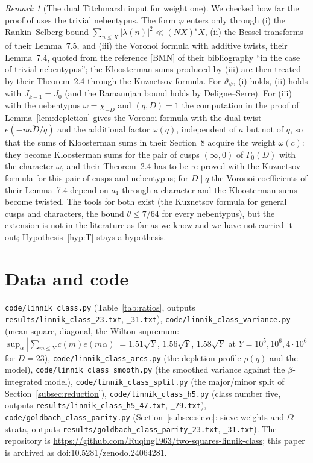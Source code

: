 \documentclass[11pt]{amsart}
\theoremstyle{remark}
\newtheorem{remark}[theorem]{Remark}
\newcommand{\vt}{\vartheta}
\newcommand{\e}{\varepsilon}
\begin{document}
\begin{remark}[The dual Titchmarsh input for weight one]\label{rem:ABL}
We checked how far the proof of \cite[Theorem~1.3]{ABL} uses the trivial nebentypus. The form $\varphi$ enters only through (i) the Rankin--Selberg bound $\sum_{n\le X}|\lambda(n)|^2\ll(NX)^\e X$, (ii) the Bessel transforms of their Lemma~7.5, and (iii) the Voronoi formula with additive twists, their Lemma~7.4, quoted from the reference [BMN] of their bibliography ``in the case of trivial nebentypus''; the Kloosterman sums produced by (iii) are then treated by their Theorem~2.4 through the Kuznetsov formula. For $\vt_\psi$, (i) holds, (ii) holds with $J_{k-1}=J_0$ (and the Ramanujan bound holds by Deligne--Serre). For (iii) with the nebentypus $\omega=\chi_{-D}$ and $(q,D)=1$ the computation in the proof of Lemma~\ref{lem:depletion} gives the Voronoi formula with the dual twist $e(-n\overline{aD}/q)$ and the additional factor $\omega(q)$, independent of $a$ but not of $q$, so that the sums of Kloosterman sums in their Section~8 acquire the weight $\omega(c)$: they become Kloosterman sums for the pair of cusps $(\infty,0)$ of $\Gamma_0(D)$ with the character $\omega$, and their Theorem~2.4 has to be re-proved with the Kuznetsov formula for this pair of cusps and nebentypus; for $D\mid q$ the Voronoi coefficients of their Lemma~7.4 depend on $a_1$ through a character and the Kloosterman sums become twisted. The tools for both exist (the Kuznetsov formula for general cusps and characters, the bound $\theta\le7/64$ for every nebentypus), but the extension is not in the literature as far as we know and we have not carried it out; Hypothesis~\ref{hyp:T} stays a hypothesis.
\end{remark}

\section*{Data and code}
{\raggedright \texttt{code/linnik\_class.py} (Table~\ref{tab:ratios}, outputs \texttt{results/linnik\_class\_23.txt}, \texttt{\_31.txt}), \texttt{code/linnik\_class\_variance.py} (mean square, diagonal, the Wilton supremum: $\sup_\alpha|\sum_{m\le Y}c(m)e(m\alpha)|=1.51\sqrt Y$, $1.56\sqrt Y$, $1.58\sqrt Y$ at $Y=10^5,10^6,4\cdot10^6$ for $D=23$), \texttt{code/linnik\_class\_arcs.py} (the depletion profile $\rho(q)$ and the model), \texttt{code/linnik\_class\_smooth.py} (the smoothed variance against the $\beta$-integrated model), \texttt{code/linnik\_class\_split.py} (the major/minor split of Section~\ref{subsec:reduction}), \texttt{code/linnik\_class\_h5.py} (class number five, outputs \texttt{results/linnik\_class\_h5\_47.txt}, \texttt{\_79.txt}), \texttt{code/goldbach\_class\_parity.py} (Section~\ref{subsec:sieve}: sieve weights and $\Omega$-strata, outputs \texttt{results/goldbach\_class\_parity\_23.txt}, \texttt{\_31.txt}). The repository is \url{https://github.com/Ruqing1963/two-squares-linnik-class}; this paper is archived as doi:10.5281/zenodo.24064281.\par}
\end{document}
